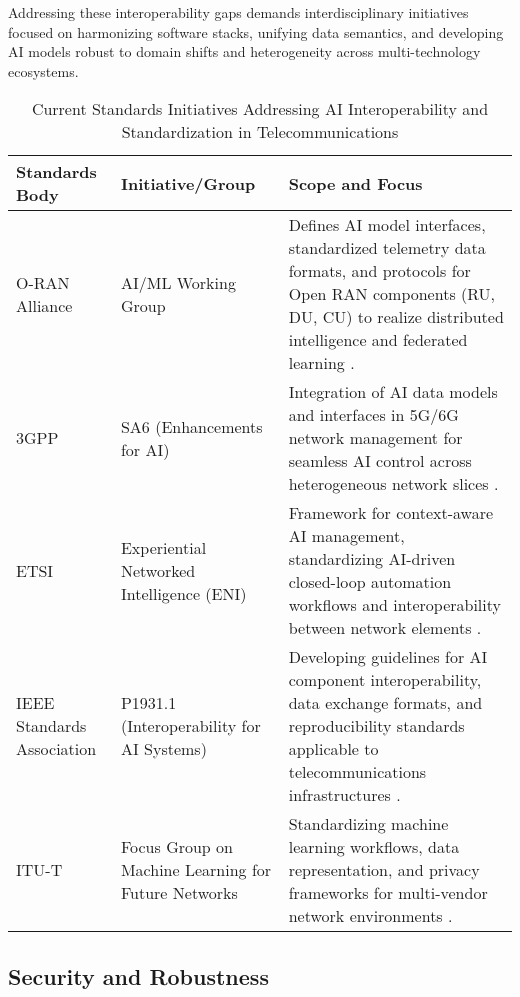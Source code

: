 \documentclass[sigconf]{acmart}
\begin{document}
Addressing these interoperability gaps demands interdisciplinary initiatives focused on harmonizing software stacks, unifying data semantics, and developing AI models robust to domain shifts and heterogeneity across multi-technology ecosystems.
\begin{table*}[htbp]
\centering
\caption{Current Standards Initiatives Addressing AI Interoperability and Standardization in Telecommunications}
\label{tab:standards_initiatives}
\begin{adjustbox}{max width=\textwidth}
\begin{tabular}{@{}lll@{}}
\toprule
\textbf{Standards Body} & \textbf{Initiative/Group} & \textbf{Scope and Focus} \\ \midrule
O-RAN Alliance & AI/ML Working Group & Defines AI model interfaces, standardized telemetry data formats, and protocols for Open RAN components (RU, DU, CU) to realize distributed intelligence and federated learning \cite{ref54}. \\
3GPP & SA6 (Enhancements for AI) & Integration of AI data models and interfaces in 5G/6G network management for seamless AI control across heterogeneous network slices \cite{ref52}. \\
ETSI & Experiential Networked Intelligence (ENI) & Framework for context-aware AI management, standardizing AI-driven closed-loop automation workflows and interoperability between network elements \cite{ref52}. \\
IEEE Standards Association & P1931.1 (Interoperability for AI Systems) & Developing guidelines for AI component interoperability, data exchange formats, and reproducibility standards applicable to telecommunications infrastructures \cite{ref48}. \\
ITU-T & Focus Group on Machine Learning for Future Networks & Standardizing machine learning workflows, data representation, and privacy frameworks for multi-vendor network environments \cite{ref54}. \\
\bottomrule
\end{tabular}
\end{adjustbox}
\end{table*}

\subsection{Security and Robustness}
\end{document}
